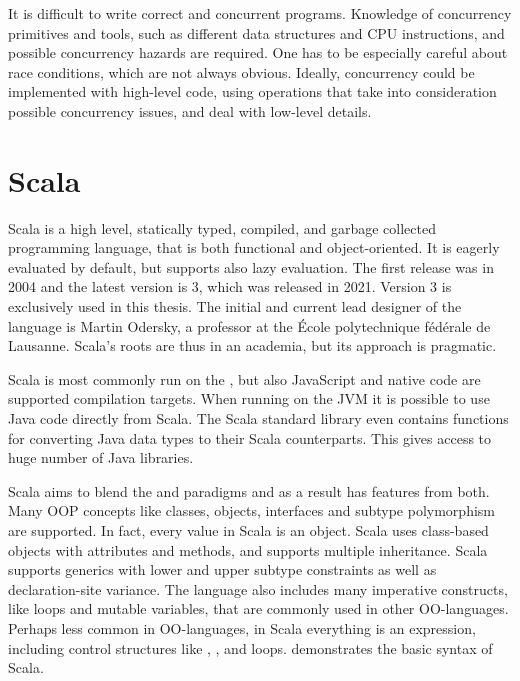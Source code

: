 It is difficult to write correct and concurrent programs. Knowledge of concurrency primitives and tools, such as different data structures and CPU instructions, and possible concurrency hazards are required. One has to be especially careful about race conditions, which are not always obvious. Ideally, concurrency could be implemented with high-level code, using operations that take into consideration possible concurrency issues, and deal with low-level details.


\section{Scala} \label{scala}
Scala is a high level, statically typed, compiled, and garbage collected programming language, that is both functional and object-oriented. It is eagerly evaluated by default, but supports also lazy evaluation. The first release was in 2004 and the latest version is 3, which was released in 2021. Version 3 is exclusively used in this thesis. The initial and current lead designer of the language is Martin Odersky, a professor at the École polytechnique fédérale de Lausanne. Scala's roots are thus in an academia, but its approach is pragmatic.

Scala is most commonly run on the , but also JavaScript and native code are supported compilation targets. When running on the JVM it is possible to use Java code directly from Scala. The Scala standard library even contains functions for converting Java data types to their Scala counterparts. This gives access to huge number of Java libraries.

Scala aims to blend the  and  paradigms and as a result has features from both. Many OOP concepts like classes, objects, interfaces and subtype polymorphism are supported. In fact, every value in Scala is an object. Scala uses class-based objects with attributes and methods, and supports multiple inheritance. Scala supports generics with lower and upper subtype constraints as well as declaration-site variance. The language also includes many imperative constructs, like loops and mutable variables, that are commonly used in other OO-languages. Perhaps less common in OO-languages, in Scala everything is an expression, including control structures like , , and loops.  demonstrates the basic syntax of Scala.

